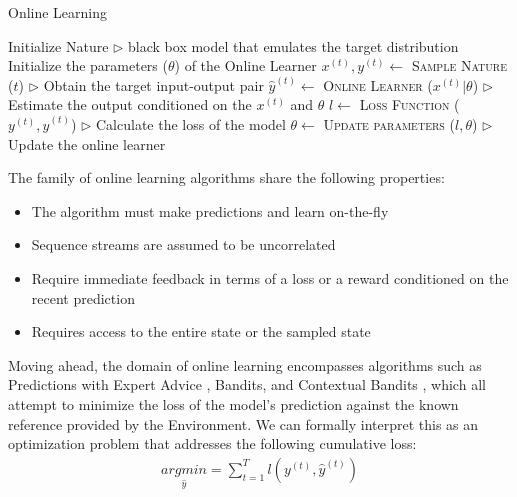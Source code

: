 \documentclass[11pt]{article}
\begin{document}
\begin{algorithm}[H]
\caption{Online Learning}
\label{algo:wma}
\begin{algorithmic}[1]
\STATE Initialize Nature \hfill $\triangleright$ black box model that emulates the target distribution
\STATE Initialize the parameters ($\theta$) of the Online Learner
    \STATE $x^{(t)}, y^{(t)}\leftarrow$ \textsc{Sample Nature} ($t$) \hfill $\triangleright$ Obtain the target input-output pair
    \STATE $\hat{y}^{(t)}\leftarrow$ \textsc{Online Learner} ($x^{(t)} | \theta$) \hfill $\triangleright$ Estimate the output conditioned on the $x^{(t)}$ and $\theta$
    \STATE $l\leftarrow$ \textsc{Loss Function} ($y^{(t)}, \hat{y}^{(t)}$) \hfill $\triangleright$ Calculate the loss of the model
    \STATE $\theta \leftarrow$ \textsc{Update parameters} ($ l, \theta$) \hfill $\triangleright$ Update the online learner\ENDFOR
\ENDFOR

\end{algorithmic}
\end{algorithm}

The family of online learning algorithms share the following properties:
\begin{itemize}
  \item The algorithm must make predictions and learn on-the-fly
  \item Sequence streams are assumed to be uncorrelated
  \item Require immediate feedback in terms of a loss or a reward conditioned on the recent prediction
  \item Requires access to the entire state or the sampled state
\end{itemize}

Moving ahead, the domain of online learning encompasses algorithms such as Predictions with Expert Advice \cite{vovk1998game}, Bandits\cite{whittle1980multi}, and Contextual Bandits \cite{lu2010contextual}, which all attempt to minimize the loss of the model's prediction against the known reference provided by the Environment. We can formally interpret this as an optimization problem that addresses the following cumulative loss:
\begin{align}
  \underset{\hat{y}}{argmin} = \sum_{t=1}^T l(y^{(t)}, \hat{y}^{(t)} )
\end{align}
\end{document}
